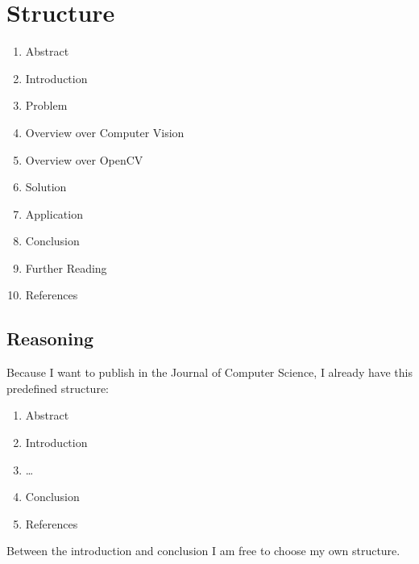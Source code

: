 \documentclass[12pt, a4paper]{article}
\begin{document}
\section*{Structure}
\begin{enumerate}
	\item Abstract
	\item Introduction
	\item Problem
	\item Overview over Computer Vision
	\item Overview over OpenCV
	\item Solution
	\item Application
	\item Conclusion
	\item Further Reading
	\item References
\end{enumerate}

\subsection*{Reasoning}
Because I want to publish in the Journal of Computer Science, I already have this predefined structure:

\begin{enumerate}
	\item Abstract
	\item Introduction
	\item \dots
	\item Conclusion
	\item References
\end{enumerate}

Between the introduction and conclusion I am free to choose my own structure.
\end{document}
